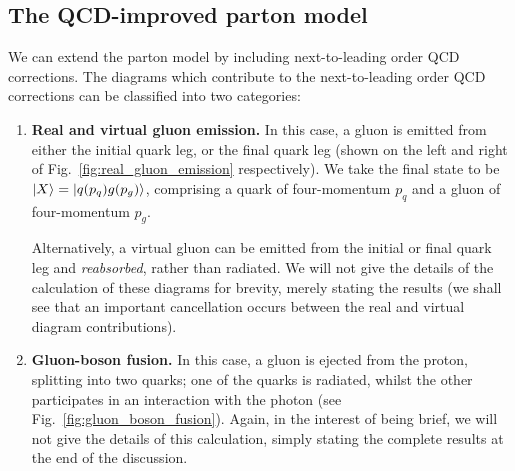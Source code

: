 \documentclass[withindex,glossary]{cam-thesis}
\begin{document}
\subsection{The QCD-improved parton model}
We can extend the parton model by including next-to-leading order QCD corrections. The diagrams which contribute to the next-to-leading order QCD corrections can be classified into two categories:
\begin{enumerate}[label = (\roman*)]
\item \textbf{Real and virtual gluon emission.} In this case, a gluon is emitted from either the initial quark leg, or the final quark leg (shown on the left and right of Fig.~\ref{fig:real_gluon_emission} respectively). We take the final state to be $\ket{X} = \ket{q(p_q) g(p_g)}$, comprising a quark of four-momentum $p_q$ and a gluon of four-momentum $p_g$.

Alternatively, a virtual gluon can be emitted from the initial or final quark leg and \textit{reabsorbed}, rather than radiated. We will not give the details of the calculation of these diagrams for brevity, merely stating the results (we shall see that an important cancellation occurs between the real and virtual diagram contributions).

\item \textbf{Gluon-boson fusion.} In this case, a gluon is ejected from the proton, splitting into two quarks; one of the quarks is radiated, whilst the other participates in an interaction with the photon (see Fig.~\ref{fig:gluon_boson_fusion}). Again, in the interest of being brief, we will not give the details of this calculation, simply stating the complete results at the end of the discussion.
\end{enumerate}
\end{document}

